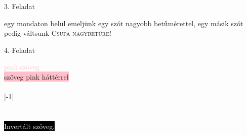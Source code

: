 \documentclass{article}
\begin{document}
\begin{center}
{\Huge 3. Feladat}
\end{center}
\textsf{egy mondaton belül emeljünk egy szót {\large nagyobb betűmérettel}, egy másik
szót pedig váltsunk \textsc {Csupa nagybetűre!}}\\

\begin{center}
{\Huge 4. Feladat}
\end{center}
\textcolor{pink}{pink szöveg}\\
\colorbox{pink}{szöveg pink háttérrel}\\
\\
\scalebox{1}[-1]{\scalebox{2.0}{tükrözött szöveg.}}\\
\\
\\
\textcolor{white}{\colorbox{black}{Invertált szöveg.}}\\
\end{document}

